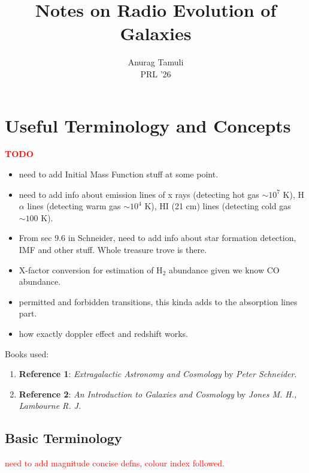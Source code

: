 \documentclass[a4paper,11pt]{report}
\title{Notes on Radio Evolution of Galaxies}
\author{Anurag Tamuli \\ PRL '26}
\date{}
\newcommand{\ti}[1]{\textit{#1}}
\newcommand{\red}[1]{\textcolor{red}{#1}}
\newcommand{\tb}[1]{\textbf{#1}}
\begin{document}
\maketitle

\tableofcontents

\newpage

\chapter{Useful Terminology and Concepts}

\red{\textbf{TODO}}

\begin{itemize}
  \item need to add Initial Mass Function stuff at some point.
  \item need to add info about emission lines of x rays (detecting hot gas $\sim 10^7$ K), H$\alpha$ lines (detecting warm gas $\sim 10^4$ K), H\RN{1} (21 cm) lines (detecting cold gas $\sim 100$ K).
  \item From sec 9.6 in Schneider, need to add info about star formation detection, IMF and other stuff. Whole treasure trove is there.
  \item X-factor conversion for estimation of H$_2$ abundance given we know CO abundance.
  \item permitted and forbidden transitions, this kinda adds to the absorption lines part.
  \item how exactly doppler effect and redshift works.
\end{itemize}

Books used:
\begin{enumerate}
  \item \tb{Reference 1}: \ti{Extragalactic Astronomy and Cosmology} by \ti{Peter Schneider}. \label{book:schneider}
  \item \tb{Reference 2}: \ti{An Introduction to Galaxies and Cosmology} by \ti{Jones M. H., Lambourne R. J.} \label{book:jones}
\end{enumerate}

\section{Basic Terminology}

\red{need to add magnitude concise defns, colour index followed.}
\end{document}
